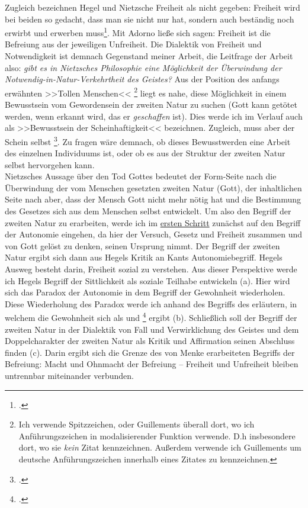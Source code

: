 \documentclass[12pt, a4paper, openany]{report}
\begin{document}
Zugleich bezeichnen Hegel und Nietzsche Freiheit als nicht gegeben: 
Freiheit wird bei beiden so gedacht, dass man sie \glqq nicht nur hat, sondern auch beständig  noch erwirbt und erwerben muss\grqq\footcite[][636]{nietzsche_morgenrote_1999}. 
Mit Adorno ließe sich sagen: Freiheit ist die Befreiung aus der jeweiligen Unfreiheit.
Die Dialektik von Freiheit und Notwendigkeit ist demnach Gegenstand meiner Arbeit, 
die Leitfrage der Arbeit also: \textit{gibt es in Nietzsches Philosophie eine Möglichkeit der Überwindung der Notwendig-in-Natur-Verkehrtheit des Geistes?}
Aus der Position des anfangs erwähnten >>Tollen Menschen<<%
\footnote{
    Ich verwende Spitzzeichen, oder Guillements überall dort, wo ich Anführungszeichen in modalisierender Funktion verwende. 
    D.h insbesondere dort, wo sie \emph{kein} Zitat kennzeichnen.
    Außerdem verwende ich Guillements um deutsche Anführungszeichen innerhalb eines Zitates zu kennzeichnen. 
}
liegt es nahe, diese Möglichkeit in einem Bewusstsein vom Gewordensein der zweiten Natur zu suchen (Gott kann getötet werden, wenn erkannt wird, das er \emph{geschaffen} ist). 
Dies werde ich im Verlauf auch als >>Bewusstsein der Scheinhaftigkeit<< bezeichnen.
Zugleich, muss aber der Schein selbst \footcite[][417.]{nietzsche_morgenrote_1999}.
Zu fragen wäre demnach, ob dieses Bewusstwerden eine Arbeit des einzelnen Individuums ist, oder ob es aus der Struktur der zweiten Natur selbst hervorgehen kann.\\

Nietzsches Aussage über den Tod Gottes bedeutet der Form-Seite nach die Überwindung der vom Menschen gesetzten zweiten Natur (Gott), der inhaltlichen Seite nach aber, dass der Mensch Gott nicht mehr nötig hat und die Bestimmung des Gesetzes sich aus dem Menschen selbst entwickelt. 
Um also den Begriff der zweiten Natur zu erarbeiten, werde ich im \hyperref[abschnitt_1]{ersten Schritt} zunächst auf den Begriff der Autonomie eingehen, da hier der Versuch, Gesetz und Freiheit zusammen und von Gott gelöst zu denken, seinen Ursprung nimmt. 
Der Begriff der zweiten Natur ergibt sich dann aus Hegels Kritik an Kants Autonomiebegriff.
Hegels Ausweg besteht darin, Freiheit sozial zu verstehen.
Aus dieser Perspektive werde ich Hegels Begriff der Sittlichkeit als soziale Teilhabe entwickeln (a).
Hier wird sich das Paradox der Autonomie in dem Begriff der Gewohnheit wiederholen.
Diese Wiederholung des Paradox werde ich anhand des Begriffs des  erläutern, in welchem die Gewohnheit sich als  und \footcite[Vgl.][145]{menke_autonomie_2018} ergibt (b).
Schließlich soll der Begriff der zweiten Natur in der Dialektik von Fall und Verwirklichung des Geistes und dem Doppelcharakter der zweiten Natur als Kritik und Affirmation seinen Abschluss finden (c).
Darin ergibt sich die Grenze des von Menke erarbeiteten Begriffs der Befreiung:
Macht und Ohnmacht der Befreiung -- Freiheit und Unfreiheit bleiben untrennbar miteinander verbunden.
\end{document}
